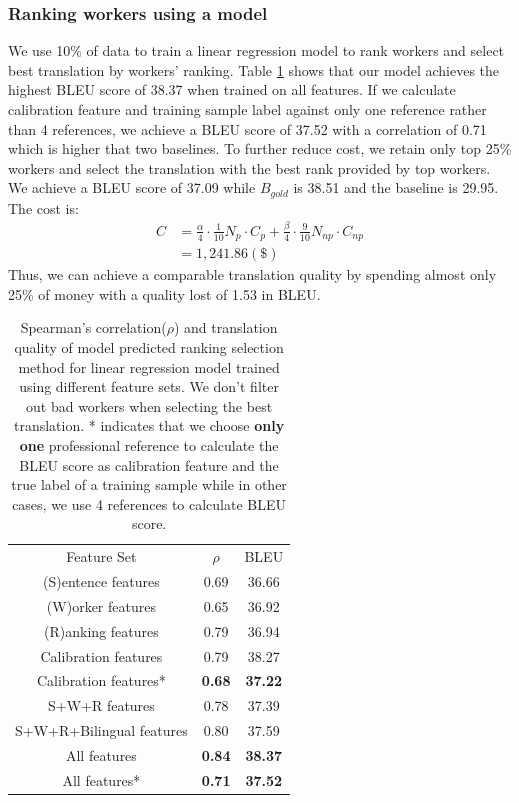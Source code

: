 \documentclass[11pt,letterpaper]{article}
\begin{document}
 \subsubsection{Ranking workers using a model}
We use 10\% of data to train a linear regression model to rank workers and select best translation by workers' ranking. Table \ref{lrresult} shows that our model achieves the highest BLEU score of 38.37 when trained on all features. If we calculate calibration feature and training sample label against only one reference rather than 4 references, we achieve a BLEU score of 37.52 with a correlation of 0.71 which is higher that two baselines. To further reduce cost, we retain only top 25\% workers and select the translation with the best rank provided by top workers. We achieve a BLEU score of 37.09 while $B_{gold}$ is 38.51 and the baseline is 29.95. The cost is:
 \begin{align*}
  C& = \frac{\alpha}{4} \cdot \frac{1}{10} N_{p}\cdot C_{p}  + \frac{\beta}{4} \cdot \frac{9}{10} N_{np} \cdot C_{np}\\
   & = 1,241.86 (\$)
 \end{align*}
 Thus, we can achieve a comparable translation quality by spending almost only 25\% of money with a quality lost of 1.53 in BLEU.
 \begin{table}[h]
 \center
\begin{tabular}{c|c|c}
\hline
Feature Set             & $\rho$  & BLEU  \\ \hhline{===}
(S)entence features     & 0.69 & 36.66 \\
(W)orker features       & 0.65 & 36.92 \\
(R)anking features      & 0.79 & 36.94 \\
Calibration features  & 0.79 & 38.27 \\
Calibration features* & \textbf{0.68} & \textbf{37.22} \\
S+W+R features          & 0.78 & 37.39 \\
S+W+R+Bilingual features        & 0.80 & 37.59 \\
All features            & \textbf{0.84} & \textbf{38.37} \\
All features*            & \textbf{0.71} & \textbf{37.52} \\ \hline
\end{tabular}
\caption{\label{lrresult} Spearman's correlation($\rho$) and translation quality of model predicted ranking selection method for linear regression model trained using different feature sets. We don't filter out bad workers when selecting the best translation. * indicates that  we choose \textbf{only one} professional reference to calculate the BLEU score as calibration feature and the true label of a training sample while in other cases, we use 4 references to calculate BLEU score. }
\end{table}
\end{document}
